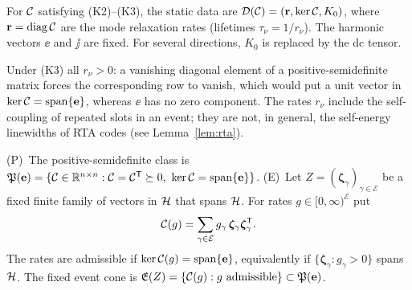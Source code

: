 \begin{definition}\label{def:data}
For $\mathcal C$ satisfying (K2)--(K3), the static data are $\mathcal D(\mathcal C)=(\mathbf r,\ker\mathcal C,K_0)$, where
$\mathbf r=\mathrm{diag}\,\mathcal C$ are the mode relaxation rates (lifetimes $\tau_\nu=1/r_\nu$). The
harmonic vectors $\ee$ and $\jj$ are fixed. For several directions, $K_0$ is replaced by the dc tensor.
\end{definition}

Under (K3) all $r_\nu>0$: a vanishing diagonal element of a positive-semidefinite matrix forces the
corresponding row to vanish, which would put a unit vector in $\ker\mathcal C=\mathrm{span}\{\mathbf e\}$, whereas
$\ee$ has no zero component. The rates $r_\nu$ include the self-coupling of repeated slots in an event;
they are not, in general, the self-energy linewidths of RTA codes (see Lemma~\ref{lem:rta}).

\begin{definition}\label{def:classes}
(P)~The positive-semidefinite class is
$\mathfrak P(\ee)=\{\Cop\in\mathbb R^{n\times n}:\Cop=\Cop\tr\succeq0,\ \ker\Cop=\mathrm{span}\{\ee\}\}$.
(E)~Let $Z=(\bm\zeta_\gamma)_{\gamma\in\mathcal E}$ be a fixed finite family of vectors in $\mathcal H$ that
spans $\mathcal H$. For rates $g\in[0,\infty)^{\mathcal E}$ put
\begin{equation}
\mathcal C(g)=\sum_{\gamma\in\mathcal E}g_\gamma\,\bm\zeta_\gamma\bm\zeta_\gamma^{\mathsf T} .
\label{eq:cone}
\end{equation}
The rates are admissible if $\ker\mathcal C(g)=\mathrm{span}\{\mathbf e\}$, equivalently if
$\{\bm\zeta_\gamma:g_\gamma>0\}$ spans $\mathcal H$. The fixed event cone is
$\mathfrak E(Z)=\{\Cop(g):g\ \text{admissible}\}\subset\mathfrak P(\ee)$.
\end{definition}

